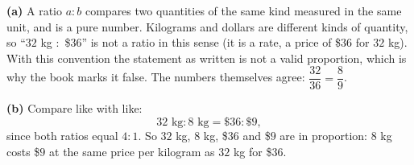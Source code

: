 \textbf{(a)} A ratio $a:b$ compares two quantities of the same kind measured in the same unit, and is a pure number. Kilograms and dollars are different kinds of quantity, so ``$32$ kg $:$ \$$36$'' is not a ratio in this sense (it is a rate, a price of \$$36$ for $32$ kg). With this convention the statement as written is not a valid proportion, which is why the book marks it false. The numbers themselves agree: $\dfrac{32}{36}=\dfrac{8}{9}$.

\textbf{(b)} Compare like with like:
\[
32\text{ kg}:8\text{ kg}=\$36:\$9,
\]
since both ratios equal $4:1$. So $32$ kg, $8$ kg, \$$36$ and \$$9$ are in proportion: $8$ kg costs \$$9$ at the same price per kilogram as $32$ kg for \$$36$.
